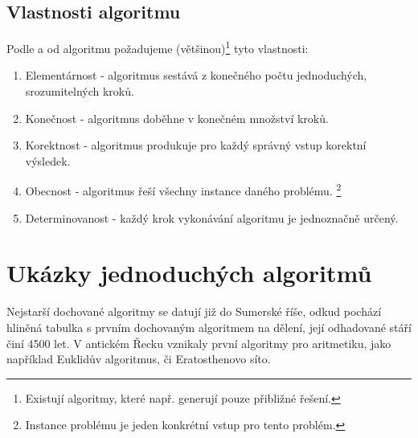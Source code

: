 \documentclass[12pt]{report}			%
\begin{document}
			\subsection{Vlastnosti algoritmu}
			Podle \cite{zaklady} a \cite{cerny} od algoritmu požadujeme (většinou)\footnote{Existují algoritmy, které např. generují pouze přibližné řešení.} tyto vlastnosti:
			\begin{enumerate}
				\item Elementárnost - algoritmus sestává z konečného počtu jednoduchých, srozumitelných kroků.
				\item Konečnost - algoritmus doběhne v konečném množství kroků.
				\item Korektnost - algoritmus produkuje pro každý správný vstup korektní výsledek.
				\item Obecnost - algoritmus řeší všechny instance daného problému. \footnote{Instance problému je jeden konkrétní vstup pro tento problém.}
				\item Determinovanost - každý krok vykonávání algoritmu je jednoznačně určený.
				
				
			\end{enumerate} 
			
			
			\section{Ukázky jednoduchých algoritmů}
			Nejstarší dochované algoritmy se datují již do Sumerské říše, odkud pochází hliněná tabulka s prvním dochovaným algoritmem na dělení, její odhadované stáří činí 4500 let. V antickém Řecku vznikaly první algoritmy pro aritmetiku, jako například Euklidův algoritmus, či Eratosthenovo síto. \cite{history}
				
				
\end{document}
